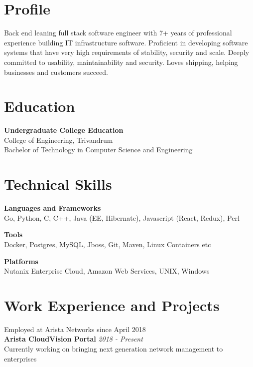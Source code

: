 \documentclass[line,margin]{res}
\begin{document}


\address{joji\_antony@gmx.com}
\address{+91 96323 41954}

\begin{resume}

\section{Profile}
Back end leaning full stack software engineer with 7+ years of professional experience building IT infrastructure software. Proficient in developing software systems that have very high requirements of stability, security and scale. Deeply committed to usability, maintainability and security. Loves shipping, helping businesses and customers succeed.

\section{Education}
{\bf Undergraduate College Education}\\
College of Engineering, Trivandrum\\
Bachelor of Technology in Computer Science and Engineering\\

\section{Technical Skills}

{\bf Languages and Frameworks}\\
Go, Python, C, C++, Java (EE, Hibernate), Javascript (React, Redux), Perl

{\bf Tools}\\
Docker, Postgres, MySQL, Jboss, Git, Maven, Linux Containers etc

{\bf Platforms}\\
Nutanix Enterprise Cloud, Amazon Web Services, UNIX, Windows

\section{Work Experience and Projects}

Employed at Arista Networks since April 2018\\

{\bf Arista CloudVision Portal} \hfill {\it{2018 - Present}}\\

Currently working on bringing next generation network management to enterprises\\


\end{resume}
\end{document}
